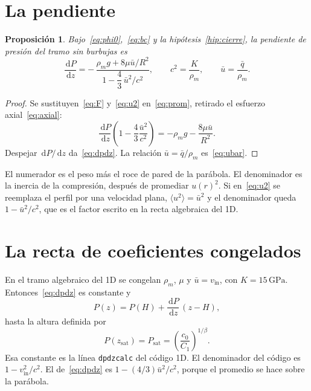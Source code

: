 \documentclass[11pt,a4paper]{article}
\newcommand{\dd}{\,\mathrm{d}}
\newcommand{\sat}{\mathrm{sat}}
\theoremstyle{plain}
\newtheorem{proposicion}{Proposición}
\theoremstyle{definition}
\theoremstyle{remark}
\begin{document}
\section{La pendiente}

\begin{proposicion}
Bajo~\eqref{eq:phi0},~\eqref{eq:bc} y la hipótesis~\ref{hip:cierre},
la pendiente de presión del tramo sin burbujas es
\begin{equation}
\frac{\dd P}{\dd z}
=
-\,
\frac{\rho_m g+8\mu\bar u/R^2}
{1-\dfrac{4}{3}\,\bar u^2/c^2},
\qquad
c^2=\frac{K}{\rho_m},
\qquad
\bar u=\frac{\bar q}{\rho_m}.
\label{eq:dpdz}
\end{equation}
\end{proposicion}

\begin{proof}
Se sustituyen~\eqref{eq:F} y~\eqref{eq:u2} en~\eqref{eq:prom},
retirado el esfuerzo axial~\eqref{eq:axial}:
\begin{equation}
\frac{\dd P}{\dd z}
\left(1-\frac{4}{3}\frac{\bar u^2}{c^2}\right)
=
-\rho_m g-\frac{8\mu\bar u}{R^2}.
\end{equation}
Despejar \(\dd P/\dd z\) da~\eqref{eq:dpdz}.
La relación \(\bar u=\bar q/\rho_m\) es~\eqref{eq:ubar}.
\end{proof}

El numerador es el peso más el roce de pared de la parábola.
El denominador es la inercia de la compresión, después de promediar
\(u(r)^2\). Si en~\eqref{eq:u2} se reemplaza el perfil por una velocidad
plana, \(\langle u^2\rangle=\bar u^2\) y el denominador queda
\(1-\bar u^2/c^2\), que es el factor escrito en la recta algebraica del 1D.

\section{La recta de coeficientes congelados}

En el tramo algebraico del 1D se congelan \(\rho_m\), \(\mu\) y
\(\bar u=v_{\mathrm{in}}\), con \(K=15\,\mathrm{GPa}\).
Entonces~\eqref{eq:dpdz} es constante y
\begin{equation}
P(z)=P(H)+\frac{\dd P}{\dd z}\,(z-H),
\label{eq:recta}
\end{equation}
hasta la altura definida por
\begin{equation}
P(z_{\sat})
=
P_{\sat}
=
\left(\frac{c_0}{C_1}\right)^{1/\beta}.
\label{eq:Psat}
\end{equation}
Esa constante es la línea \texttt{dpdzcalc} del código 1D.
El denominador del código es \(1-v_{\mathrm{in}}^2/c^2\).
El de~\eqref{eq:dpdz} es \(1-(4/3)\bar u^2/c^2\), porque el promedio se hace
sobre la parábola.
\end{document}
